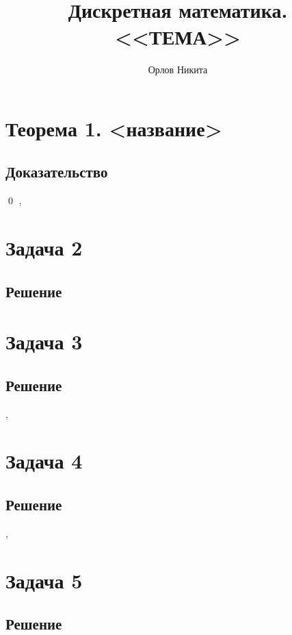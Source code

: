 \documentclass[a4paper,12pt]{article}
\begin{document}
	\title{Дискретная математика. <<ТЕМА>>}
	\author{Орлов Никита}
	\maketitle
	
	\section*{Теорема 1. <название>}
	\subsection*{Доказательство}
    
	\qed %
	\sep	
	
	
	\section*{Задача 2}
	
	\subsection*{Решение}
	
	\section*{Задача 3}
	
	
	\subsection*{Решение}
	
	
	\sep	
	
	\section*{Задача 4}

	\subsection*{Решение}


	\sep	
	
	\section*{Задача 5}
	
	\subsection*{Решение}
	
\end{document}

